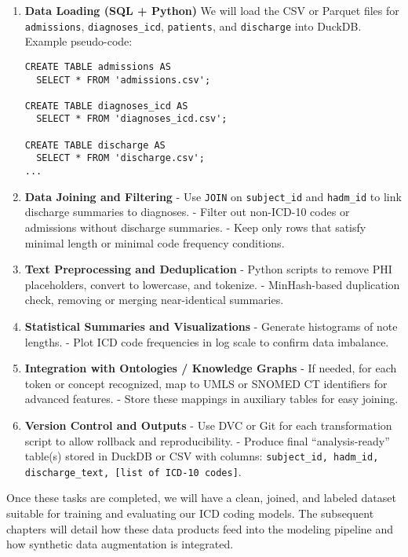 \begin{enumerate}
    \item \textbf{Data Loading (SQL + Python)}  
    We will load the CSV or Parquet files for \texttt{admissions}, \texttt{diagnoses\_icd}, \texttt{patients}, and \texttt{discharge} into DuckDB. Example pseudo-code:
\begin{verbatim}
CREATE TABLE admissions AS
  SELECT * FROM 'admissions.csv';

CREATE TABLE diagnoses_icd AS
  SELECT * FROM 'diagnoses_icd.csv';

CREATE TABLE discharge AS
  SELECT * FROM 'discharge.csv';
...
\end{verbatim}
    \item \textbf{Data Joining and Filtering}  
    - Use \texttt{JOIN} on \texttt{subject\_id} and \texttt{hadm\_id} to link discharge summaries to diagnoses.  
    - Filter out non-ICD-10 codes or admissions without discharge summaries.  
    - Keep only rows that satisfy minimal length or minimal code frequency conditions.

    \item \textbf{Text Preprocessing and Deduplication}  
    - Python scripts to remove PHI placeholders, convert to lowercase, and tokenize.  
    - MinHash-based duplication check, removing or merging near-identical summaries.

    \item \textbf{Statistical Summaries and Visualizations}  
    - Generate histograms of note lengths.  
    - Plot ICD code frequencies in log scale to confirm data imbalance.  

    \item \textbf{Integration with Ontologies / Knowledge Graphs}  
    - If needed, for each token or concept recognized, map to UMLS or SNOMED CT identifiers for advanced features.  
    - Store these mappings in auxiliary tables for easy joining.

    \item \textbf{Version Control and Outputs}  
    - Use DVC or Git for each transformation script to allow rollback and reproducibility.  
    - Produce final “analysis-ready” table(s) stored in DuckDB or CSV with columns: \texttt{subject\_id, hadm\_id, discharge\_text, [list of ICD-10 codes]}.
\end{enumerate}

Once these tasks are completed, we will have a clean, joined, and labeled dataset suitable for training and evaluating our ICD coding models. The subsequent chapters will detail how these data products feed into the modeling pipeline and how synthetic data augmentation is integrated. 






